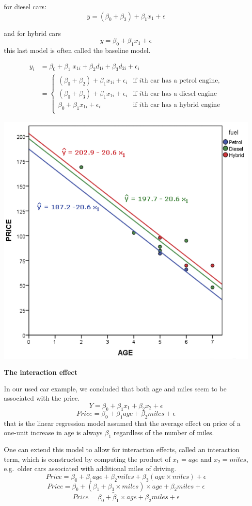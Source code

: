 \documentclass[
]{article}
\begin{document}
for diesel cars: \[y=(\beta_0+\beta_3)+\beta_1 x_{1} +\epsilon\]

and for hybrid cars \[y=\beta_0+\beta_1 x_{1}+\epsilon\] this last model
is often called the baseline model.

\begin{align*}y_i&=\beta_0+\beta_1 \;x_{1i}+\beta_2 d_{1i}+\beta_3 d_{2i}+\epsilon_i\\
&=\left\{\begin{array}{ll}
(\beta_0+\beta_2)+\beta_1 x_{1i} +\epsilon_i& \text{if $i$th car has a petrol engine,}\\
(\beta_0+\beta_3)+\beta_1 x_{1i} +\epsilon_i& \text{if $i$th car  has a diesel engine}\\
\beta_0+\beta_1 x_{1i}+\epsilon_i& \text{if $i$th car has a hybrid engine}\\
\end{array}\right.
\end{align*}

\begin{center}\includegraphics[width=0.6\linewidth,height=0.6\textheight]{figures/fig2_dummy} \end{center}

\textbf{The interaction effect}

In our used car example, we concluded that both age and miles seem to be
associated with the price.
\[Y = \beta_0 + \beta_1 x_1 + \beta_2 x_2 +\epsilon\]
\[Price = \beta_0 + \beta_1 age + \beta_2 miles +\epsilon\] that is the
linear regression model assumed that the average effect on price of a
one-unit increase in age is always \(\beta_1\) regardless of the number
of miles.

One can extend this model to allow for interaction effects, called an
interaction term, which is constructed by computing the product of
\(x_1=age\) and \(x_2=miles\), e.g.~older cars associated with
additional miles of driving.
\[Price = \beta_0 + \beta_1 age + \beta_2 miles + \beta_3 (age\times miles)+\epsilon\]
\[Price = \beta_0 + (\beta_1+\beta_3\times miles) \times age + \beta_2 miles + \epsilon\]
\[Price = \beta_0 + \tilde{\beta}_1  \times age + \beta_2 miles + \epsilon
\]
\end{document}
